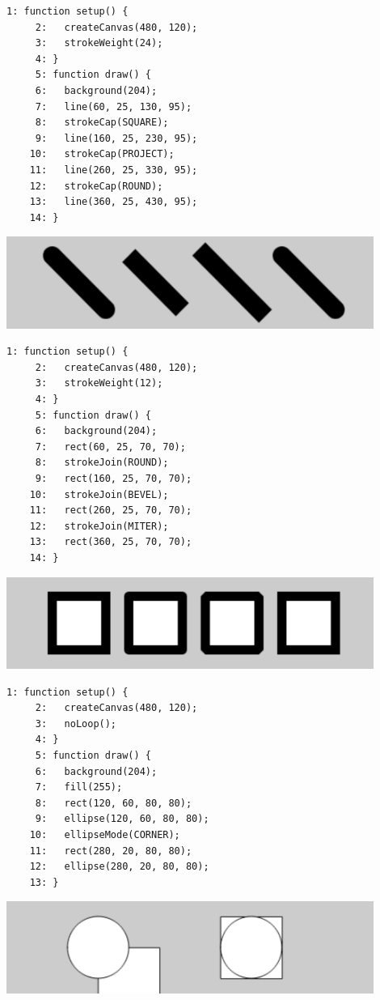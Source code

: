 \documentclass[a4j]{ltjsarticle}
\begin{document}
\begin{lstlisting}[caption=Ex\_03\_12.js]
     1: function setup() {
     2:   createCanvas(480, 120);
     3:   strokeWeight(24);
     4: }
     5: function draw() {
     6:   background(204);
     7:   line(60, 25, 130, 95);
     8:   strokeCap(SQUARE);
     9:   line(160, 25, 230, 95);
    10:   strokeCap(PROJECT);
    11:   line(260, 25, 330, 95);
    12:   strokeCap(ROUND);
    13:   line(360, 25, 430, 95);
    14: }
\end{lstlisting}
\includegraphics[height=3cm]{image/Ex_03_12.pdf}
\begin{lstlisting}[caption=Ex\_03\_13.js]
     1: function setup() {
     2:   createCanvas(480, 120);
     3:   strokeWeight(12);
     4: }
     5: function draw() {
     6:   background(204);
     7:   rect(60, 25, 70, 70);
     8:   strokeJoin(ROUND);
     9:   rect(160, 25, 70, 70);
    10:   strokeJoin(BEVEL);
    11:   rect(260, 25, 70, 70);
    12:   strokeJoin(MITER);
    13:   rect(360, 25, 70, 70);
    14: }
\end{lstlisting}
\includegraphics[height=3cm]{image/Ex_03_13.pdf}
\begin{lstlisting}[caption=Ex\_03\_14.js]
     1: function setup() {
     2:   createCanvas(480, 120);
     3:   noLoop();
     4: }
     5: function draw() {
     6:   background(204);
     7:   fill(255);
     8:   rect(120, 60, 80, 80);
     9:   ellipse(120, 60, 80, 80);
    10:   ellipseMode(CORNER);
    11:   rect(280, 20, 80, 80);
    12:   ellipse(280, 20, 80, 80);
    13: }
\end{lstlisting}
\includegraphics[height=3cm]{image/Ex_03_14.pdf}
\end{document}
